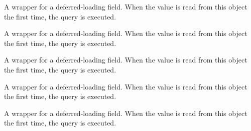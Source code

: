 \documentclass[letterpaper,10pt,english]{sphinxmanual}
\begin{document}
\begin{fulllineitems}

\begin{fulllineitems}
\label{\detokenize{QuChemPedIA.models:QuChemPedIA.models.UserModel.Utilisateur.active}}
A wrapper for a deferred-loading field. When the value is read from this
object the first time, the query is executed.

\end{fulllineitems}


\begin{fulllineitems}
\label{\detokenize{QuChemPedIA.models:QuChemPedIA.models.UserModel.Utilisateur.admin}}
A wrapper for a deferred-loading field. When the value is read from this
object the first time, the query is executed.

\end{fulllineitems}


\begin{fulllineitems}
\label{\detokenize{QuChemPedIA.models:QuChemPedIA.models.UserModel.Utilisateur.affiliation}}
A wrapper for a deferred-loading field. When the value is read from this
object the first time, the query is executed.

\end{fulllineitems}


\begin{fulllineitems}
\label{\detokenize{QuChemPedIA.models:QuChemPedIA.models.UserModel.Utilisateur.email}}
A wrapper for a deferred-loading field. When the value is read from this
object the first time, the query is executed.

\end{fulllineitems}


\begin{fulllineitems}
\label{\detokenize{QuChemPedIA.models:QuChemPedIA.models.UserModel.Utilisateur.first_name}}
A wrapper for a deferred-loading field. When the value is read from this
object the first time, the query is executed.


\end{fulllineitems}
\end{fulllineitems}
\end{document}
